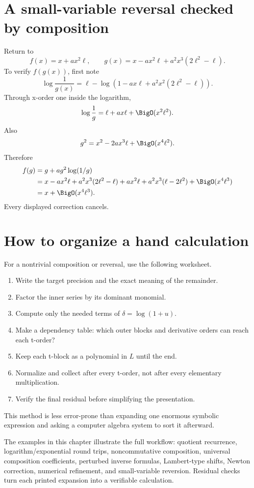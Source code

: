 \documentclass[11pt,openany]{book}
\theoremstyle{definition}
\theoremstyle{plain}
\theoremstyle{remark}
\begin{document}
\section{A small-variable reversal checked by composition}
Return to
\[
 f(x)=x+a x^2\ell,
 \qquad
 g(x)=x-a x^2\ell+a^2x^3(2\ell^2-\ell).
\]
To verify \(f(g(x))\), first note
\[
 \log\frac1{g(x)}
 =\ell-\log\left(1-a x\ell+a^2x^2(2\ell^2-\ell)\right).
\]
Through x-order one inside the logarithm,
\[
 \log\frac1g=\ell+a x\ell+\BigO(x^2\ell^2).
\]
Also
\[
 g^2=x^2-2a x^3\ell+\BigO(x^4\ell^2).
\]
Therefore
\begin{align*}
 f(g)&=g+a g^2\log(1/g)\\
 &=x-a x^2\ell+a^2x^3(2\ell^2-\ell)
   +a x^2\ell+a^2x^3(\ell-2\ell^2)
   +\BigO(x^4\ell^3)\\
 &=x+\BigO(x^4\ell^3).
\end{align*}
Every displayed correction cancels.

\section{How to organize a hand calculation}
For a nontrivial composition or reversal, use the following worksheet.
\begin{enumerate}
\item Write the target precision and the exact meaning of the remainder.
\item Factor the inner series by its dominant monomial.
\item Compute only the needed terms of \(\delta=\log(1+u)\).
\item Make a dependency table: which outer blocks and derivative orders can
      reach each t-order?
\item Keep each t-block as a polynomial in \(L\) until the end.
\item Normalize and collect after every t-order, not after every elementary
      multiplication.
\item Verify the final residual before simplifying the presentation.
\end{enumerate}
This method is less error-prone than expanding one enormous symbolic expression
and asking a computer algebra system to sort it afterward.

\begin{summarybox}
The examples in this chapter illustrate the full workflow: quotient recurrence,
logarithm/exponential round trips, noncommutative composition, universal
composition coefficients, perturbed inverse formulas, Lambert-type shifts,
Newton correction, numerical refinement, and small-variable reversion.
Residual checks turn each printed expansion into a verifiable calculation.
\end{summarybox}
\end{document}
